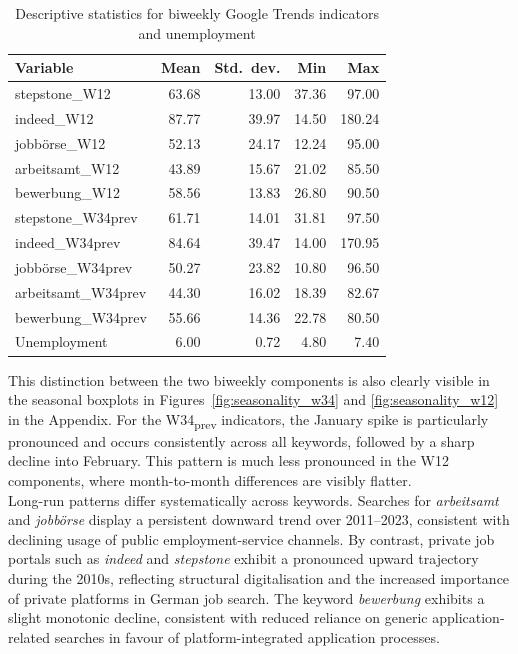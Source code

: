 \documentclass[12pt,a4paper]{article}
\begin{document}
\begin{table}[ht]
\centering
\caption{Descriptive statistics for biweekly Google Trends indicators and unemployment}
\label{tab:descriptives}
\begin{tabular}{lrrrr}
\toprule
Variable & Mean & Std.\ dev. & Min & Max \\
\midrule
stepstone\_W12      & 63.68 & 13.00 & 37.36 & 97.00 \\
indeed\_W12         & 87.77 & 39.97 & 14.50 & 180.24 \\
jobbörse\_W12       & 52.13 & 24.17 & 12.24 & 95.00 \\
arbeitsamt\_W12     & 43.89 & 15.67 & 21.02 & 85.50 \\
bewerbung\_W12      & 58.56 & 13.83 & 26.80 & 90.50 \\
stepstone\_W34prev  & 61.71 & 14.01 & 31.81 & 97.50 \\
indeed\_W34prev     & 84.64 & 39.47 & 14.00 & 170.95 \\
jobbörse\_W34prev   & 50.27 & 23.82 & 10.80 & 96.50 \\
arbeitsamt\_W34prev & 44.30 & 16.02 & 18.39 & 82.67 \\
bewerbung\_W34prev  & 55.66 & 14.36 & 22.78 & 80.50 \\
Unemployment        &  6.00 &  0.72 &  4.80 &  7.40 \\
\bottomrule
\end{tabular}
\end{table}
This distinction between the two biweekly components is also clearly visible in the seasonal boxplots in Figures~\ref{fig:seasonality_w34} and \ref{fig:seasonality_w12} in the Appendix. For the W34\textsubscript{prev} indicators, the January spike is particularly pronounced and occurs consistently across all keywords, followed by a sharp decline into February. This pattern is much less pronounced in the W12 components, where month-to-month differences are visibly flatter.\\
Long-run patterns differ systematically across keywords. Searches for \textit{arbeitsamt} and \textit{jobbörse} display a persistent downward trend over 2011--2023, consistent with declining usage of public employment-service channels. By contrast, private job portals such as \textit{indeed} and \textit{stepstone} exhibit a pronounced upward trajectory during the 2010s, reflecting structural digitalisation and the increased importance of private platforms in German job search. The keyword \textit{bewerbung} exhibits a slight monotonic decline, consistent with reduced reliance on generic application-related searches in favour of platform-integrated application processes.\\
\end{document}
